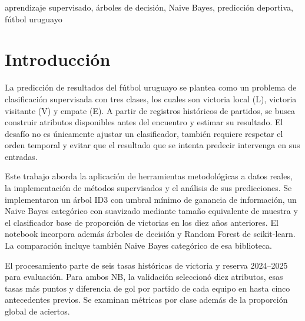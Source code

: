 \documentclass[conference]{IEEEtran}
\begin{document}
\begin{abstract}
En este informe, se estudia la predicción de victoria local, visitante o empate en el fútbol uruguayo mediante atributos históricos causales y validación temporal. Se conserva un conjunto común de 14.705 partidos hasta 2023 y se evalúan 472 de 2024--2025. Para Naive Bayes propio y su versión de scikit-learn, la selección secuencial de suavizado y atributos produce modelos equivalentes de diez entradas, con un accuracy de 0,4788 y macro-F1 0,4454, frente a 0,4619 y 0,3564 del baseline de diez años. Por otro lado el ID3 propio alcanza 0,4661 y 0,4027, y su versión de scikit-learn sobre los mismos códigos, 0,4682 y 0,4109. El bosque aleatorio sobre tasas continuas queda en 0,4258 y 0,4219. La mayor dificultad encontrada son los empates.
\end{abstract}

\begin{IEEEkeywords}
aprendizaje supervisado, árboles de decisión, Naive Bayes, predicción deportiva, fútbol uruguayo
\end{IEEEkeywords}

\section{Introducción}
La predicción de resultados del fútbol uruguayo se plantea como un problema de clasificación supervisada con tres clases, los cuales son victoria local (L), victoria visitante (V) y empate (E). A partir de registros históricos de partidos, se busca construir atributos disponibles antes del encuentro y estimar su resultado. El desafío no es únicamente ajustar un clasificador, también requiere respetar el orden temporal y evitar que el resultado que se intenta predecir intervenga en sus entradas.

Este trabajo aborda la aplicación de herramientas metodológicas a datos reales, la implementación de métodos supervisados y el análisis de sus predicciones. Se implementaron un árbol ID3 con umbral mínimo de ganancia de información, un Naive Bayes categórico con suavizado mediante tamaño equivalente de muestra y el clasificador base de proporción de victorias en los diez años anteriores. El notebook incorpora además árboles de decisión y Random Forest de scikit-learn. La comparación incluye también Naive Bayes categórico de esa biblioteca.

El procesamiento parte de seis tasas históricas de victoria y reserva 2024--2025 para evaluación. Para ambos NB, la validación seleccionó diez atributos, esas tasas más puntos y diferencia de gol por partido de cada equipo en hasta cinco antecedentes previos. Se examinan métricas por clase además de la proporción global de aciertos.
\end{document}
